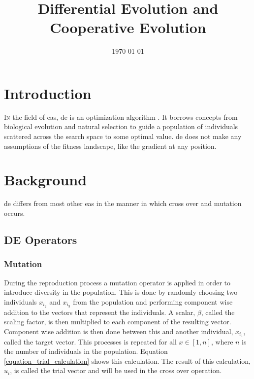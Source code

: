 \documentclass[hidelinks,english,conference]{IEEEtran}
\date{\today}
\begin{document}
\title{Differential Evolution and Cooperative Evolution}
\author{
}
\maketitle



\IEEEpeerreviewmaketitle

\section{Introduction}
	\lettrine{I}{n} the field of \glspl{ea}, \gls{de} is an optimization algorithm \cite{brest2006self}. It borrows concepts from biological evolution and natural selection to guide a population of individuals scattered across the search space to some optimal value. \gls{de} does not make any assumptions of the fitness landscape, like the gradient at any position.
	
\section{Background}
	\gls{de} differs from most other \glspl{ea} in the manner in which cross over and mutation occurs.
	
	\subsection{DE Operators}
		\subsubsection{Mutation}\label{section_mutation}
			During the reproduction process a mutation operator is applied in order to introduce diversity in the population. This is done by randomly choosing two individuals $x_{i_2}$ and $x_{i_3}$ from the population and performing component wise addition to the vectors that represent the individuals. A scalar, $\beta$, called the scaling factor, is then multiplied to each component of the resulting vector. Component wise addition is then done between this and another individual, $x_{i_1}$, called the target vector. This processes is repeated for all $x \in \left[1,n\right]$, where $n$ is the number of individuals in the population. Equation \ref{equation_trial_calculation} \cite{engelbrecht2007computational}\cite{yang2007differential} shows this calculation. The result of this calculation, $u_i$, is called the trial vector and will be used in the cross over operation.
			
\end{document}
